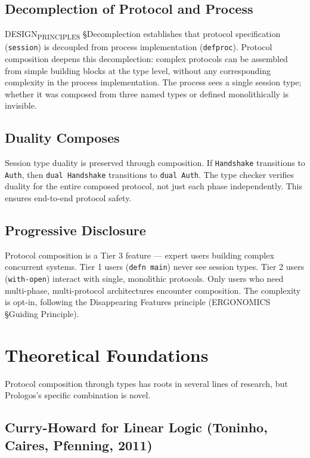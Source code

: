 \documentclass[11pt]{article}
\begin{document}
\subsection{Decomplection of Protocol and Process}
\label{sec:org051ff39}

DESIGN\textsubscript{PRINCIPLES} §Decomplection establishes that protocol specification
(\texttt{session}) is decoupled from process implementation (\texttt{defproc}). Protocol
composition deepens this decomplection: complex protocols can be assembled
from simple building blocks at the type level, without any corresponding
complexity in the process implementation. The process sees a single session
type; whether it was composed from three named types or defined monolithically
is invisible.
\subsection{Duality Composes}
\label{sec:org061ba85}

Session type duality is preserved through composition. If \texttt{Handshake}
transitions to \texttt{Auth}, then \texttt{dual Handshake} transitions to \texttt{dual Auth}. The
type checker verifies duality for the entire composed protocol, not just each
phase independently. This ensures end-to-end protocol safety.
\subsection{Progressive Disclosure}
\label{sec:org11a5e1c}

Protocol composition is a Tier 3 feature --- expert users building complex
concurrent systems. Tier 1 users (\texttt{defn main}) never see session types. Tier 2
users (\texttt{with-open}) interact with single, monolithic protocols. Only users who
need multi-phase, multi-protocol architectures encounter composition. The
complexity is opt-in, following the Disappearing Features principle
(ERGONOMICS §Guiding Principle).
\section{Theoretical Foundations}
\label{sec:org52cf036}

Protocol composition through types has roots in several lines of research,
but Prologos's specific combination is novel.
\subsection{Curry-Howard for Linear Logic (Toninho, Caires, Pfenning, 2011)}
\label{sec:org3fa04f8}
\end{document}
